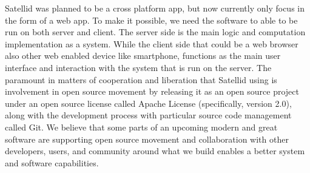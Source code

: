 Satellid was planned to be a cross platform app, but now currently only focus in the form of a web app.
To make it possible, we need the software to able to be run on both server and client.
The server side is the main logic and computation implementation as a system.
While the client side that could be a web browser also other web enabled device like smartphone, functions as the main user interface and interaction with the system that is run on the server.
The paramount in matters of cooperation and liberation that Satellid using is involvement in open source movement by releasing it as an open source project under an open source license called Apache License (specifically, version 2.0), along with the development process with particular source code management called Git.
We believe that some parts of an upcoming modern and great software are supporting open source movement and collaboration with other developers, users, and community around what we build enables a better system and software capabilities.

